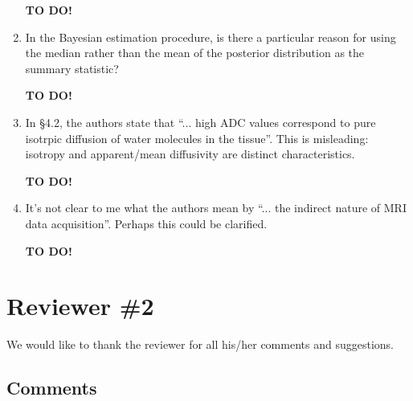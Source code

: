 \documentclass[11pt]{article}
\begin{document}
\begin{enumerate}
  \textbf{TO DO!}

\item In the Bayesian estimation procedure, is there a particular
  reason for using the median rather than the mean of the posterior
  distribution as the summary statistic?

  \textbf{TO DO!}

\item In \S4.2, the authors state that ``... high ADC values correspond
  to pure isotrpic diffusion of water molecules in the tissue''.  This
  is misleading: isotropy and apparent/mean diffusivity are distinct
  characteristics.

  \textbf{TO DO!}

\item It's not clear to me what the authors mean by ``... the indirect
  nature of MRI data acquisition''.  Perhaps this could be clarified.

  \textbf{TO DO!}

\end{enumerate}

\section*{Reviewer \#2}

We would like to thank the reviewer for all his/her comments and
suggestions.

\subsection*{Comments}
\end{document}
